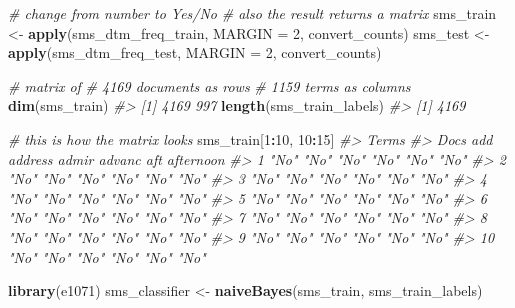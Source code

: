 \documentclass[]{book}
\newenvironment{Shaded}{\begin{snugshade}}{\end{snugshade}}
\newcommand{\CommentTok}[1]{\textcolor[rgb]{0.56,0.35,0.01}{\textit{#1}}}
\newcommand{\DataTypeTok}[1]{\textcolor[rgb]{0.13,0.29,0.53}{#1}}
\newcommand{\DecValTok}[1]{\textcolor[rgb]{0.00,0.00,0.81}{#1}}
\newcommand{\KeywordTok}[1]{\textcolor[rgb]{0.13,0.29,0.53}{\textbf{#1}}}
\newcommand{\NormalTok}[1]{#1}
\newcommand{\OperatorTok}[1]{\textcolor[rgb]{0.81,0.36,0.00}{\textbf{#1}}}
\newcommand{\StringTok}[1]{\textcolor[rgb]{0.31,0.60,0.02}{#1}}
\begin{document}
\begin{Shaded}
\begin{Highlighting}[]
\CommentTok{# change from number to Yes/No}
\CommentTok{# also the result returns a matrix}
\NormalTok{sms_train <-}\StringTok{ }\KeywordTok{apply}\NormalTok{(sms_dtm_freq_train, }\DataTypeTok{MARGIN =} \DecValTok{2}\NormalTok{,}
\NormalTok{                                       convert_counts)}
\NormalTok{sms_test  <-}\StringTok{ }\KeywordTok{apply}\NormalTok{(sms_dtm_freq_test, }\DataTypeTok{MARGIN =} \DecValTok{2}\NormalTok{,}
\NormalTok{                                      convert_counts)}
\end{Highlighting}
\end{Shaded}

\begin{Shaded}
\begin{Highlighting}[]
\CommentTok{# matrix of}
\CommentTok{# 4169 documents as rows}
\CommentTok{# 1159 terms as columns}
\KeywordTok{dim}\NormalTok{(sms_train)}
\CommentTok{#> [1] 4169  997}
\KeywordTok{length}\NormalTok{(sms_train_labels)}
\CommentTok{#> [1] 4169}
\end{Highlighting}
\end{Shaded}

\begin{Shaded}
\begin{Highlighting}[]
\CommentTok{# this is how the matrix looks}
\NormalTok{sms_train[}\DecValTok{1}\OperatorTok{:}\DecValTok{10}\NormalTok{, }\DecValTok{10}\OperatorTok{:}\DecValTok{15}\NormalTok{]}
\CommentTok{#>     Terms}
\CommentTok{#> Docs add  address admir advanc aft  afternoon}
\CommentTok{#>   1  "No" "No"    "No"  "No"   "No" "No"     }
\CommentTok{#>   2  "No" "No"    "No"  "No"   "No" "No"     }
\CommentTok{#>   3  "No" "No"    "No"  "No"   "No" "No"     }
\CommentTok{#>   4  "No" "No"    "No"  "No"   "No" "No"     }
\CommentTok{#>   5  "No" "No"    "No"  "No"   "No" "No"     }
\CommentTok{#>   6  "No" "No"    "No"  "No"   "No" "No"     }
\CommentTok{#>   7  "No" "No"    "No"  "No"   "No" "No"     }
\CommentTok{#>   8  "No" "No"    "No"  "No"   "No" "No"     }
\CommentTok{#>   9  "No" "No"    "No"  "No"   "No" "No"     }
\CommentTok{#>   10 "No" "No"    "No"  "No"   "No" "No"}
\end{Highlighting}
\end{Shaded}

\begin{Shaded}
\begin{Highlighting}[]
\KeywordTok{library}\NormalTok{(e1071)}
\NormalTok{sms_classifier <-}\StringTok{ }\KeywordTok{naiveBayes}\NormalTok{(sms_train, sms_train_labels)}
\end{Highlighting}
\end{Shaded}
\end{document}
